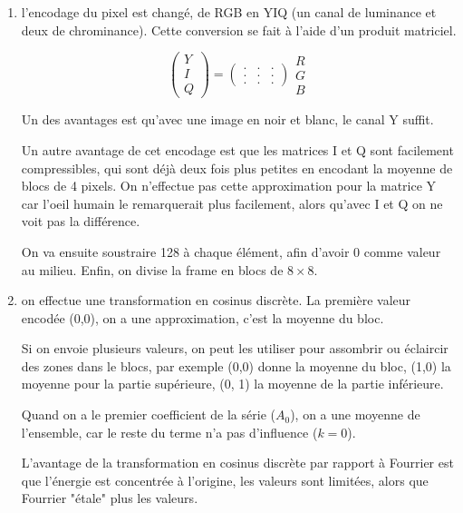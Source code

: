 		\begin{enumerate}
			\item l'encodage du pixel est changé, de RGB en YIQ (un canal de luminance et deux de chrominance). Cette conversion se fait à l'aide d'un produit matriciel.
			
			$$
\begin{pmatrix}
Y \\ 
I \\ 
Q
\end{pmatrix} = \begin{pmatrix}
. & . & . \\ 
. & . & . \\ 
. & . & .
\end{pmatrix} \begin{array}{c}
R \\ 
G \\ 
B
\end{array}$$
			
			Un des avantages est qu'avec une image en noir et blanc, le canal Y suffit.
			
			
			Un autre avantage de cet encodage est que les matrices I et Q sont facilement compressibles, qui sont déjà deux fois plus petites en encodant la moyenne de blocs de 4 pixels. On n'effectue pas cette approximation pour la matrice Y car l'oeil humain le remarquerait plus facilement, alors qu'avec I et Q on ne voit pas la différence.
			
			On va ensuite soustraire 128 à chaque élément, afin d'avoir 0 comme valeur au milieu. Enfin, on divise la frame en blocs de $8 \times 8$.
			
			\item on effectue une transformation en cosinus discrète. La première valeur encodée (0,0), on a une approximation, c'est la moyenne du bloc.
			
			
			Si on envoie plusieurs valeurs, on peut les utiliser pour assombrir ou éclaircir des zones dans le blocs, par exemple (0,0) donne la moyenne du bloc, (1,0) la moyenne pour la partie supérieure, (0, 1) la moyenne de la partie inférieure.
			
			Quand on a le premier coefficient de la série ($A_0$), on a une moyenne de l'ensemble, car le reste du terme n'a pas d'influence ($k = 0$).
			
			L'avantage de la transformation en cosinus discrète par rapport à Fourrier est que l'énergie est concentrée à l'origine, les valeurs sont limitées, alors que Fourrier "étale" plus les valeurs.
			

\end{enumerate}
